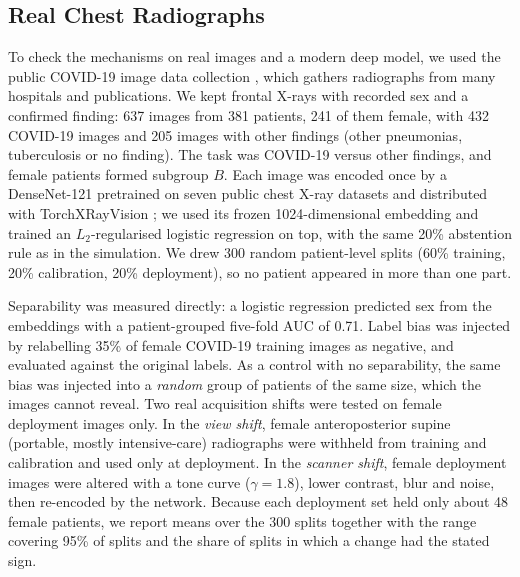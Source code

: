 \subsection{Real Chest Radiographs}
\label{sec:realmethod}
To check the mechanisms on real images and a modern deep model, we used the public COVID-19 image data collection \cite{cohen2020covid}, which gathers radiographs from many hospitals and publications. We kept frontal X-rays with recorded sex and a confirmed finding: 637 images from 381 patients, 241 of them female, with 432 COVID-19 images and 205 images with other findings (other pneumonias, tuberculosis or no finding). The task was COVID-19 versus other findings, and female patients formed subgroup $B$. Each image was encoded once by a DenseNet-121 pretrained on seven public chest X-ray datasets and distributed with TorchXRayVision \cite{cohen2021xrv}; we used its frozen 1024-dimensional embedding and trained an $L_2$-regularised logistic regression on top, with the same 20\% abstention rule as in the simulation. We drew 300 random patient-level splits (60\% training, 20\% calibration, 20\% deployment), so no patient appeared in more than one part.

Separability was measured directly: a logistic regression predicted sex from the embeddings with a patient-grouped five-fold AUC of 0.71. Label bias was injected by relabelling 35\% of female COVID-19 training images as negative, and evaluated against the original labels. As a control with no separability, the same bias was injected into a \emph{random} group of patients of the same size, which the images cannot reveal. Two real acquisition shifts were tested on female deployment images only. In the \emph{view shift}, female anteroposterior supine (portable, mostly intensive-care) radiographs were withheld from training and calibration and used only at deployment. In the \emph{scanner shift}, female deployment images were altered with a tone curve ($\gamma = 1.8$), lower contrast, blur and noise, then re-encoded by the network. Because each deployment set held only about 48 female patients, we report means over the 300 splits together with the range covering 95\% of splits and the share of splits in which a change had the stated sign.
